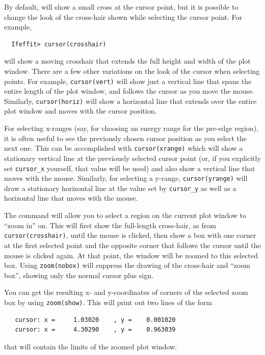 By default, {} will show a small cross at the cursor point,
but it is possible to change the look of the cross-hair shown while
selecting the cursor point.  For example,
\begin{verbatim}
  Ifeffit> cursor(crosshair)
\end{verbatim}
\noindent
will show a moving crosshair that extends the full height and width of the
plot window.  There are a few other variations on the look of the cursor
when selecting points.  For example, {\tt{cursor(vert)}} will show just a
vertical line that spans the entire length of the plot window, and follows
the cursor as you move the mouse.  Similarly, {\tt{cursor(horiz)}} will
show a horizontal line that extends over the entire plot window and moves
with the cursor position.

{}
{}
For selecting x-ranges (say, for choosing an energy range for the pre-edge
region), it is often useful to see the previously chosen cursor position as
you select the next one.  This can be accomplished with
{\tt{cursor(xrange)}} which will show a stationary vertical line at the
previously selected cursor point (or, if you explicitly set
{\tt{cursor\_x}} yourself, that value will be used) and also show a
vertical line that moves with the mouse.  Similarly, for selecting a
y-range, {\tt{cursor(yrange)}} will draw a stationary horizontal line at
the value set by {\tt{cursor\_y}} as well as a horizontal line that moves
with the mouse.

The {} command will allow you to select a region on the current
plot window to ``zoom in'' on.  This will first show the full-length
cross-hair, as from {\tt{cursor(crosshair)}}, until the mouse is clicked,
then show a box with one corner at the first selected point and the
opposite corner that follows the cursor until the mouse is clicked again.
At that point, the window will be zoomed to this selected box.  Using
{\tt{zoom(nobox)}} will suppress the drawing of the cross-hair and ``zoom
box'', showing only the normal cursor plus sign.

You can get the resulting x- and y-coordinates of corners of the selected
zoom box by using {\tt{zoom(show)}}.  This will print out two lines of the
form
\begin{verbatim}
   cursor: x =     1.03020    , y =    0.001020
   cursor: x =     4.30290    , y =    0.963039
\end{verbatim}
\noindent
that will contain the limits of the zoomed plot window.


